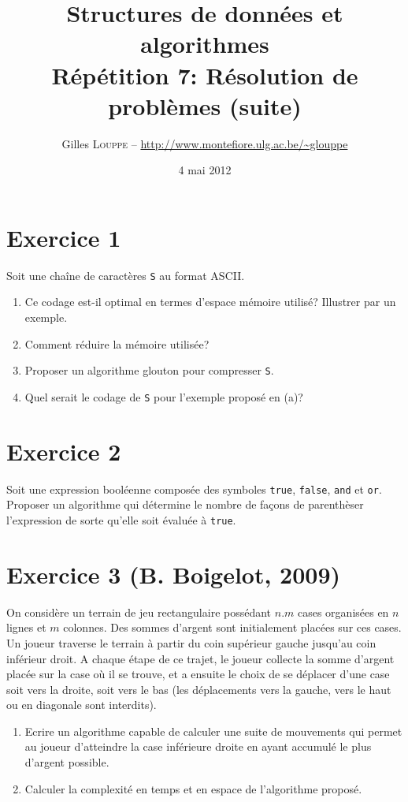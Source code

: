 \documentclass[a4paper,10pt]{article}
\title{
    \textbf{Structures de données et algorithmes}\\
    Répétition 7: Résolution de problèmes (suite)
}
\author{Gilles \textsc{Louppe} -- \url{http://www.montefiore.ulg.ac.be/~glouppe}}
\date{4 mai 2012}
\begin{document}
\maketitle

\section*{Exercice 1}

Soit une chaîne de caractères \texttt{S} au format ASCII.

\begin{enumerate}
\item Ce codage est-il optimal en termes d'espace mémoire utilisé? Illustrer par un exemple.
\item Comment réduire la mémoire utilisée?
\item Proposer un algorithme glouton pour compresser \texttt{S}.
\item Quel serait le codage de \texttt{S} pour l'exemple proposé en (a)?
\end{enumerate}

\section*{Exercice 2}


Soit une expression booléenne composée des symboles \texttt{true},
\texttt{false}, \texttt{and} et \texttt{or}. Proposer un algorithme qui
détermine le nombre de façons de parenthèser l'expression de sorte qu'elle soit
évaluée à \texttt{true}.

\section*{Exercice 3 (B. Boigelot, 2009)}

On considère un terrain de jeu rectangulaire possédant $n.m$ cases organisées en
$n$ lignes et $m$ colonnes. Des sommes d'argent sont initialement placées sur
ces cases. Un joueur traverse le terrain à partir du coin supérieur gauche
jusqu'au coin inférieur droit. A chaque étape de ce trajet, le joueur collecte
la somme d'argent placée sur la case où il se trouve, et a ensuite le choix de
se déplacer d'une case soit vers la droite, soit vers le bas (les déplacements
vers la gauche, vers le haut ou en diagonale sont interdits).

\begin{enumerate}
\item Ecrire un algorithme capable de calculer une suite de mouvements qui
permet au joueur d'atteindre la case inférieure droite en ayant accumulé le
plus d'argent possible.
\item Calculer la complexité en temps et en espace de l'algorithme proposé.
\end{enumerate}
\end{document}
